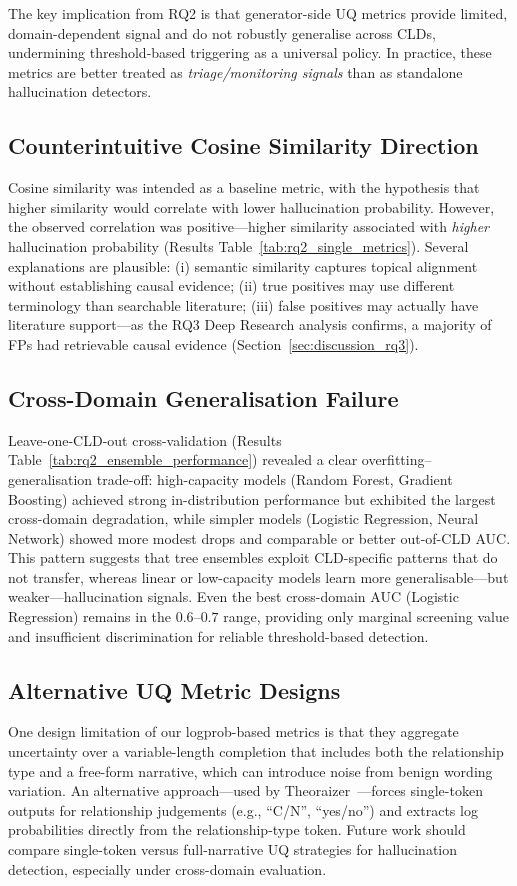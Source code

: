 The key implication from RQ2 is that generator-side UQ metrics provide limited, domain-dependent signal and do not robustly generalise across CLDs, undermining threshold-based triggering as a universal policy. In practice, these metrics are better treated as \textit{triage/monitoring signals} than as standalone hallucination detectors.

\subsection{Counterintuitive Cosine Similarity Direction}
\label{sec:cosine_paradox}

Cosine similarity was intended as a baseline metric, with the hypothesis that higher similarity would correlate with lower hallucination probability. However, the observed correlation was positive---higher similarity associated with \textit{higher} hallucination probability (Results Table~\ref{tab:rq2_single_metrics}). Several explanations are plausible: (i) semantic similarity captures topical alignment without establishing causal evidence; (ii) true positives may use different terminology than searchable literature; (iii) false positives may actually have literature support---as the RQ3 Deep Research analysis confirms, a majority of FPs had retrievable causal evidence (Section~\ref{sec:discussion_rq3}).

\subsection{Cross-Domain Generalisation Failure}

Leave-one-CLD-out cross-validation (Results Table~\ref{tab:rq2_ensemble_performance}) revealed a clear overfitting--generalisation trade-off: high-capacity models (Random Forest, Gradient Boosting) achieved strong in-distribution performance but exhibited the largest cross-domain degradation, while simpler models (Logistic Regression, Neural Network) showed more modest drops and comparable or better out-of-CLD AUC. This pattern suggests that tree ensembles exploit CLD-specific patterns that do not transfer, whereas linear or low-capacity models learn more generalisable---but weaker---hallucination signals. Even the best cross-domain AUC (Logistic Regression) remains in the $0.6$--$0.7$ range, providing only marginal screening value and insufficient discrimination for reliable threshold-based detection.

\subsection{Alternative UQ Metric Designs}
One design limitation of our logprob-based metrics is that they aggregate uncertainty over a variable-length completion that includes both the relationship type and a free-form narrative, which can introduce noise from benign wording variation. An alternative approach---used by Theoraizer~\citep{Waaijers2024theoraizer}---forces single-token outputs for relationship judgements (e.g., ``C/N'', ``yes/no'') and extracts log probabilities directly from the relationship-type token. Future work should compare single-token versus full-narrative UQ strategies for hallucination detection, especially under cross-domain evaluation.

